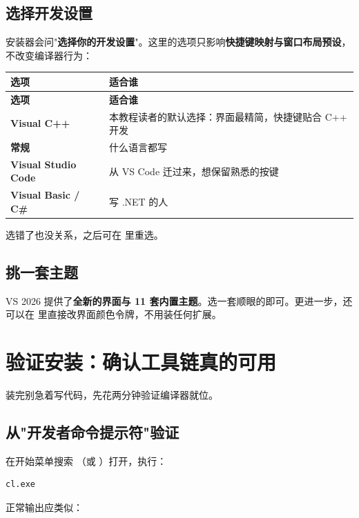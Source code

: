 \subsection{选择开发设置}
安装器会问"\textbf{选择你的开发设置}"。这里的选项只影响\textbf{快捷键映射与窗口布局预设}，不改变编译器行为：

\begin{longtable}{L{5.0cm}L{10.0cm}}
\toprule
\textbf{选项} & \textbf{适合谁} \\
\midrule
\endfirsthead
\toprule
\textbf{选项} & \textbf{适合谁} \\
\midrule
\endhead
\bottomrule
\endlastfoot
\textbf{Visual C++} & 本教程读者的默认选择：界面最精简，快捷键贴合 C++ 开发 \\
\textbf{常规} & 什么语言都写 \\
\textbf{Visual Studio Code} & 从 VS Code 迁过来，想保留熟悉的按键 \\
\textbf{Visual Basic / C\#} & 写 .NET 的人 \\
\end{longtable}

\begin{tipbox}[提示]
选错了也没关系，之后可在  里重选。
\end{tipbox}

\subsection{挑一套主题}
VS 2026 提供了\textbf{全新的界面与 11 套内置主题}。选一套顺眼的即可。更进一步，还可以在  里直接改界面颜色令牌，不用装任何扩展。

\section{验证安装：确认工具链真的可用}
装完别急着写代码，先花两分钟验证编译器就位。

\subsection{从"开发者命令提示符"验证}
在开始菜单搜索 （或 ）打开，执行：

\begin{lstlisting}[style=shellstyle]
cl.exe
\end{lstlisting}

正常输出应类似：

